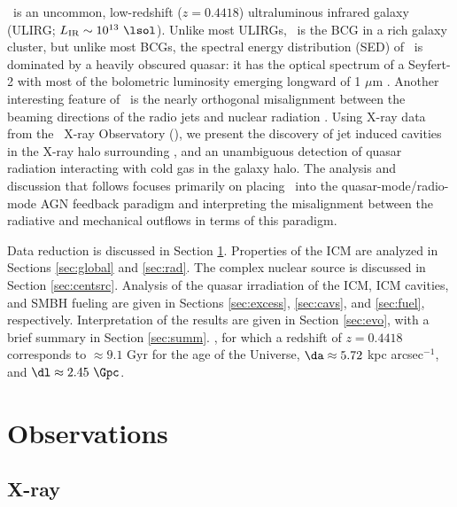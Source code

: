 \documentclass[useAMS,usenatbib]{mn2e}
\begin{document}
\irs\ is an uncommon, low-redshift ($z = 0.4418$) ultraluminous
infrared galaxy (ULIRG; $L_{\mathrm{IR}} \sim 10^{13} ~\lsol$). Unlike
most ULIRGs, \irs\ is the BCG in a rich galaxy cluster, but unlike
most BCGs, the spectral energy distribution (SED) of \irs\ is
dominated by a heavily obscured quasar: it has the optical spectrum of
a Seyfert-2 with most of the bolometric luminosity emerging longward
of 1 $\mu$m \citep{1988ApJ...328..161K, 1993ApJ...415...82H,
  1994ApJ...436L..51F, 1998ApJ...506..205E, 2000A&A...353..910F,
  2001MNRAS.321L..15I}. Another interesting feature of \irs\ is the
nearly orthogonal misalignment between the beaming directions of the
radio jets and nuclear radiation \citep[][hereafter
  H99]{1999ApJ...512..145H}. Using X-ray data from the \chandra\ X-ray
Observatory (\cxo), we present the discovery of jet induced cavities
in the X-ray halo surrounding \irs, and an unambiguous detection of
quasar radiation interacting with cold gas in the galaxy halo. The
analysis and discussion that follows focuses primarily on placing
\irs\ into the quasar-mode/radio-mode AGN feedback paradigm and
interpreting the misalignment between the radiative and mechanical
outflows in terms of this paradigm.

Data reduction is discussed in Section \ref{sec:obs}. Properties of
the ICM are analyzed in Sections \ref{sec:global} and
\ref{sec:rad}. The complex nuclear source is discussed in Section
\ref{sec:centsrc}. Analysis of the quasar irradiation of the ICM, ICM
cavities, and SMBH fueling are given in Sections \ref{sec:excess},
\ref{sec:cavs}, and \ref{sec:fuel}, respectively. Interpretation of
the results are given in Section \ref{sec:evo}, with a brief summary
in Section \ref{sec:summ}. \LCDM, for which a redshift of $z = 0.4418$
corresponds to $\approx 9.1$ Gyr for the age of the Universe, $\da
\approx 5.72$ kpc arcsec$^{-1}$, and $\dl \approx 2.45~\Gpc$.

\section{Observations}
\label{sec:obs}

\subsection{X-ray}
\label{sec:xray}
\end{document}
